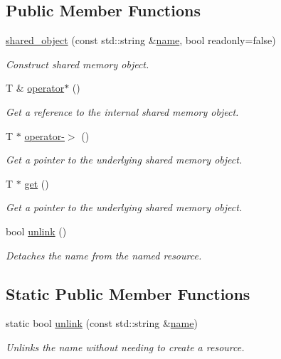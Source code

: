 \subsection*{Public Member Functions}
\begin{DoxyCompactItemize}
\item 
\hyperlink{classcpen333_1_1process_1_1shared__object_ac8e7c58b5066b058d32e27a7d068f504}{shared\+\_\+object} (const std\+::string \&\hyperlink{classcpen333_1_1process_1_1impl_1_1named__resource__base_a53986a0a1dd26a3602b842c45613b79d}{name}, bool readonly=false)
\begin{DoxyCompactList}\small\item\em Construct shared memory object. \end{DoxyCompactList}\item 
T \& \hyperlink{classcpen333_1_1process_1_1shared__object_ad1ffd4ad5e13a87f27d9253b816b0b9f}{operator$\ast$} ()
\begin{DoxyCompactList}\small\item\em Get a reference to the internal shared memory object. \end{DoxyCompactList}\item 
T $\ast$ \hyperlink{classcpen333_1_1process_1_1shared__object_ad5a71ce94a79904c4ef85c5a5d1f44f9}{operator-\/$>$} ()
\begin{DoxyCompactList}\small\item\em Get a pointer to the underlying shared memory object. \end{DoxyCompactList}\item 
T $\ast$ \hyperlink{classcpen333_1_1process_1_1shared__object_ac6d38c3ca35cfb102905b6e9dbe4b1ce}{get} ()
\begin{DoxyCompactList}\small\item\em Get a pointer to the underlying shared memory object. \end{DoxyCompactList}\item 
bool \hyperlink{classcpen333_1_1process_1_1shared__object_aa5b43829da5bd2376927e6285745211c}{unlink} ()
\begin{DoxyCompactList}\small\item\em Detaches the name from the named resource. \end{DoxyCompactList}\end{DoxyCompactItemize}
\subsection*{Static Public Member Functions}
\begin{DoxyCompactItemize}
\item 
static bool \hyperlink{classcpen333_1_1process_1_1shared__object_a478c2228031b8471b1e729ce78aabd97}{unlink} (const std\+::string \&\hyperlink{classcpen333_1_1process_1_1impl_1_1named__resource__base_a53986a0a1dd26a3602b842c45613b79d}{name})
\begin{DoxyCompactList}\small\item\em Unlinks the name without needing to create a resource. \end{DoxyCompactList}\end{DoxyCompactItemize}



